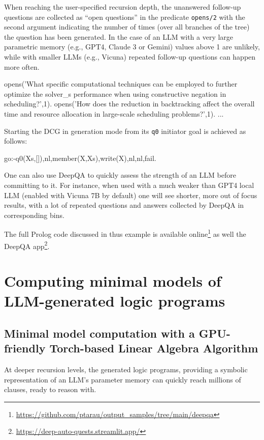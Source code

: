 \documentclass[submission,copyright,creativecommons]{eptcs}
\begin{document}
When reaching the user-specified recursion depth, the unanswered follow-up questions are collected as ``open questions'' in the predicate {\tt opens/2} with the second argument indicating the number of times (over all branches of the tree) the question has been generated. In the case of an LLM with a very large parametric memory (e.g., GPT4, Claude 3 or Gemini) values above 1 are unlikely, while with smaller LLMs (e.g., Vicuna) repeated follow-up questions can happen more often.
\begin{code}

opens('What specific computational techniques can be employed to further optimize 
     the solver_s performance when using constructive negation in scheduling?',1).
opens('How does the reduction in backtracking affect the overall time and 
              resource allocation in large-scale scheduling problems?',1).
...
\end{code}
Starting the DCG in generation mode from its {\tt q0} initiator goal is achieved as follows:
\begin{code}
go:-q0(Xs,[]),nl,member(X,Xs),write(X),nl,nl,fail.
\end{code}

\EX
One can also use DeepQA to quickly assess the strength of an LLM before committing to it.
For instance, when used with a much weaker than GPT4 local LLM (enabled with Vicuna 7B by default) one will see shorter, more out of focus results, with a lot of repeated questions and answers collected by DeepQA in corresponding bins.


The full Prolog code discussed in thus example is available 
online\footnote{\url{https://github.com/ptarau/output_samples/tree/main/deepqa}}
as well the DeepQA app\footnote{\url{https://deep-auto-quests.streamlit.app/}}.


\section{Computing minimal models of LLM-generated logic programs}\label{torch}

\subsection{Minimal model computation with a GPU-friendly Torch-based Linear Algebra Algorithm}

At deeper recursion levels, the generated logic programs,  providing a symbolic representation of an LLM's parameter memory can quickly 
reach millions of clauses, ready to reason with.
\end{document}
